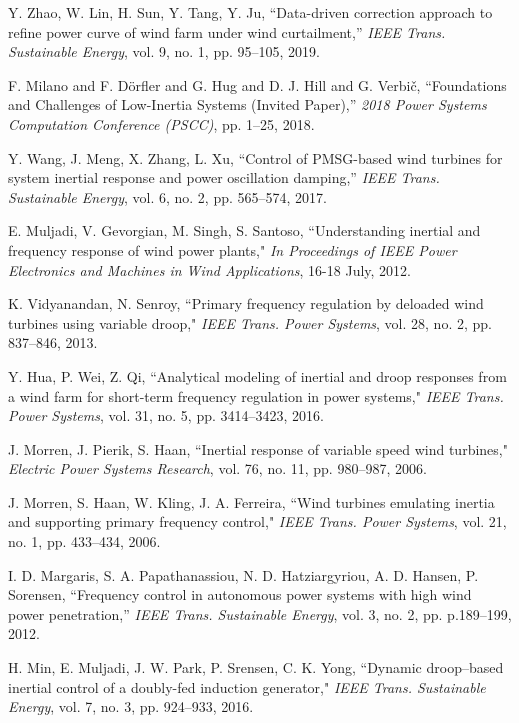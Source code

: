 \documentclass[journal]{IEEEtran}
\begin{document}
\begin{thebibliography}{99}
Y. Zhao, W. Lin, H. Sun, Y. Tang, Y. Ju, ``Data-driven correction approach to refine power curve of wind farm under wind curtailment,'' \emph{IEEE Trans. Sustainable Energy},  vol. 9,  no. 1, pp. 95--105, 2019.

F. {Milano} and F. {D{\"o}rfler} and G. {Hug} and D. J. {Hill} and G. Verbi{\v{c}}, ``Foundations and Challenges of Low-Inertia Systems (Invited Paper),'' \emph{2018 Power Systems Computation Conference (PSCC)}, pp. 1--25, 2018.

Y. Wang, J. Meng, X. Zhang, L. Xu, ``Control of PMSG-based wind turbines for system inertial response and power oscillation damping,” \emph{IEEE Trans. Sustainable Energy},  vol. 6, no. 2,  pp. 565–574, 2017.

E. Muljadi, V. Gevorgian, M. Singh, S. Santoso, ``Understanding inertial and frequency response of wind power plants," \emph{In Proceedings of IEEE Power Electronics and Machines in Wind Applications}, 16-18 July, 2012.

K. Vidyanandan, N. Senroy, ``Primary frequency regulation  by deloaded wind turbines using variable droop," \emph{IEEE Trans. Power Systems}, vol. 28, no. 2, pp. 837–846, 2013.

Y. Hua,  P. Wei, Z. Qi, ``Analytical modeling of inertial and  droop responses from a wind farm for short-term frequency regulation in power systems," \emph{IEEE Trans. Power Systems}, vol. 31, no. 5, pp. 3414–3423, 2016.

J. Morren, J. Pierik, S. Haan, ``Inertial response of variable speed wind turbines," \emph{Electric Power Systems Research}, vol. 76, no. 11, pp. 980–987, 2006.

J. Morren, S. Haan, W. Kling, J. A. Ferreira, ``Wind turbines  emulating inertia and supporting primary frequency control," \emph{IEEE Trans. Power Systems}, vol. 21, no. 1, pp. 433–434, 2006.

I. D. Margaris, S. A. Papathanassiou, N. D. Hatziargyriou, A. D. Hansen, P. Sorensen, ``Frequency control in autonomous power systems with high wind power penetration,” \emph{IEEE Trans. Sustainable Energy}, vol. 3, no. 2, pp. p.189–199, 2012.

H. Min, E. Muljadi, J. W. Park, P. Srensen, C. K. Yong, “Dynamic droop–based inertial control of a doubly-fed induction generator," \emph{IEEE Trans. Sustainable Energy}, vol. 7, no. 3, pp. 924–933, 2016.


\end{thebibliography}
\end{document}
